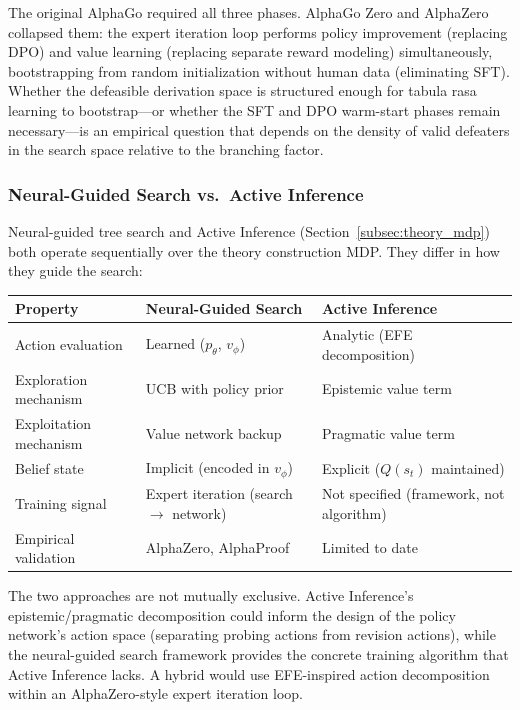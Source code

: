 \documentclass{article}
\theoremstyle{definition}
\begin{document}
The original AlphaGo required all three phases. AlphaGo Zero and AlphaZero collapsed them: the expert iteration loop performs policy improvement (replacing DPO) and value learning (replacing separate reward modeling) simultaneously, bootstrapping from random initialization without human data (eliminating SFT). Whether the defeasible derivation space is structured enough for tabula rasa learning to bootstrap---or whether the SFT and DPO warm-start phases remain necessary---is an empirical question that depends on the density of valid defeaters in the search space relative to the branching factor.

\subsubsection{Neural-Guided Search vs.\ Active Inference}

Neural-guided tree search and Active Inference (Section~\ref{subsec:theory_mdp}) both operate sequentially over the theory construction MDP. They differ in how they guide the search:

\begin{center}
\small
\begin{tabular}{@{}lll@{}}
\toprule
Property & Neural-Guided Search & Active Inference \\
\midrule
Action evaluation & Learned ($p_\theta$, $v_\phi$) & Analytic (EFE decomposition) \\
Exploration mechanism & UCB with policy prior & Epistemic value term \\
Exploitation mechanism & Value network backup & Pragmatic value term \\
Belief state & Implicit (encoded in $v_\phi$) & Explicit ($Q(s_t)$ maintained) \\
Training signal & Expert iteration (search $\to$ network) & Not specified (framework, not algorithm) \\
Empirical validation & AlphaZero, AlphaProof & Limited to date \\
\bottomrule
\end{tabular}
\end{center}

The two approaches are not mutually exclusive. Active Inference's epistemic/pragmatic decomposition could inform the design of the policy network's action space (separating probing actions from revision actions), while the neural-guided search framework provides the concrete training algorithm that Active Inference lacks. A hybrid would use EFE-inspired action decomposition within an AlphaZero-style expert iteration loop.
\end{document}
